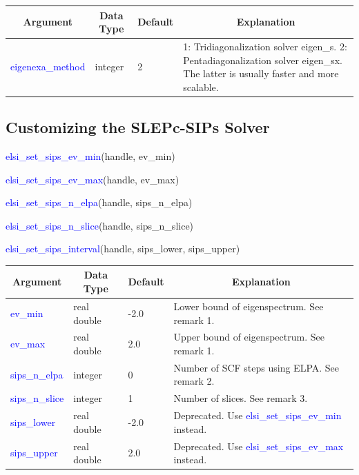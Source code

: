 \documentclass{report}
\begin{document}
\begin{tabular}[]{|p{30mm}|p{20mm}|p{15mm}|p{100mm}|}
\hline
\multicolumn{1}{|c|}{\textbf{Argument}} & \multicolumn{1}{c|}{\textbf{Data Type}} & \multicolumn{1}{c|}{\textbf{Default}} & \multicolumn{1}{c|}{\textbf{Explanation}}\\
\hline
\textcolor{blue}{eigenexa\_method}       & integer & 2 & 1: Tridiagonalization solver eigen\_s. 2: Pentadiagonalization solver eigen\_sx. The latter is usually faster and more scalable.\\
\hline
\end{tabular}

\subsection{Customizing the SLEPc-SIPs Solver}
\label{subsec:setter_sips}
\begin{labeling}{\hspace{6cm}}
\item [\hspace{0.3cm} \textcolor{blue}{elsi\_set\_sips\_ev\_min}(handle, ev\_min)]
\item [\hspace{0.3cm} \textcolor{blue}{elsi\_set\_sips\_ev\_max}(handle, ev\_max)]
\item [\hspace{0.3cm} \textcolor{blue}{elsi\_set\_sips\_n\_elpa}(handle, sips\_n\_elpa)]
\item [\hspace{0.3cm} \textcolor{blue}{elsi\_set\_sips\_n\_slice}(handle, sips\_n\_slice)]
\item [\hspace{0.3cm} \textcolor{blue}{elsi\_set\_sips\_interval}(handle, sips\_lower, sips\_upper)]
\end{labeling}

\begin{tabular}[]{|p{30mm}|p{20mm}|p{15mm}|p{100mm}|}
\hline
\multicolumn{1}{|c|}{\textbf{Argument}} & \multicolumn{1}{c|}{\textbf{Data Type}} & \multicolumn{1}{c|}{\textbf{Default}} & \multicolumn{1}{c|}{\textbf{Explanation}}\\
\hline
\textcolor{blue}{ev\_min}        & real double & -2.0 & Lower bound of eigenspectrum. See remark 1.\\
\hline
\textcolor{blue}{ev\_max}        & real double & 2.0  & Upper bound of eigenspectrum. See remark 1.\\
\hline
\textcolor{blue}{sips\_n\_elpa}  & integer     & 0    & Number of SCF steps using ELPA. See remark 2.\\
\hline
\textcolor{blue}{sips\_n\_slice} & integer     & 1    & Number of slices. See remark 3.\\
\hline
\textcolor{blue}{sips\_lower}    & real double & -2.0 & Deprecated. Use \textcolor{blue}{elsi\_set\_sips\_ev\_min} instead.\\
\hline
\textcolor{blue}{sips\_upper}    & real double & 2.0  & Deprecated. Use \textcolor{blue}{elsi\_set\_sips\_ev\_max} instead.\\
\hline
\end{tabular}
\end{document}
